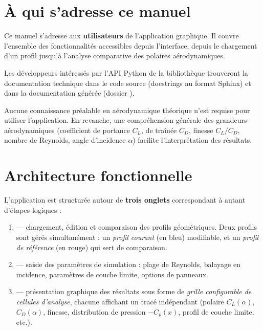 
\section{À qui s'adresse ce manuel}

Ce manuel s'adresse aux \textbf{utilisateurs} de l'application
graphique. Il couvre l'ensemble des fonctionnalités accessibles
depuis l'interface, depuis le chargement d'un profil jusqu'à
l'analyse comparative des polaires aérodynamiques.

Les développeurs intéressés par l'API Python de la bibliothèque
trouveront la documentation technique dans le code source
(docstrings au format Sphinx) et dans la documentation générée
(dossier ).

\begin{noteinfo}
Aucune connaissance préalable en aérodynamique théorique
n'est requise pour utiliser l'application. En revanche, une
compréhension générale des grandeurs aérodynamiques (coefficient
de portance $C_L$, de traînée $C_D$, finesse $C_L/C_D$,
nombre de Reynolds, angle d'incidence $\alpha$) facilite
l'interprétation des résultats.
\end{noteinfo}

\section{Architecture fonctionnelle}

L'application est structurée autour de \textbf{trois onglets}
correspondant à autant d'étapes logiques :

\begin{enumerate}
    \item {} --- chargement, édition et comparaison des
        profils géométriques. Deux profils sont gérés simultanément :
        un \emph{profil courant} (en bleu) modifiable, et un
        \emph{profil de référence} (en rouge) qui sert de
        comparaison.
    \item {} --- saisie des paramètres de
        simulation : plage de Reynolds, balayage en incidence,
        paramètres de couche limite, options de panneaux.
    \item {} --- présentation graphique des résultats
        sous forme de \emph{grille configurable de cellules
        d'analyse}, chacune affichant un tracé indépendant
        (polaire $C_L(\alpha)$, $C_D(\alpha)$, finesse, distribution
        de pression $-C_p(x)$, profil de couche limite, etc.).
\end{enumerate}

